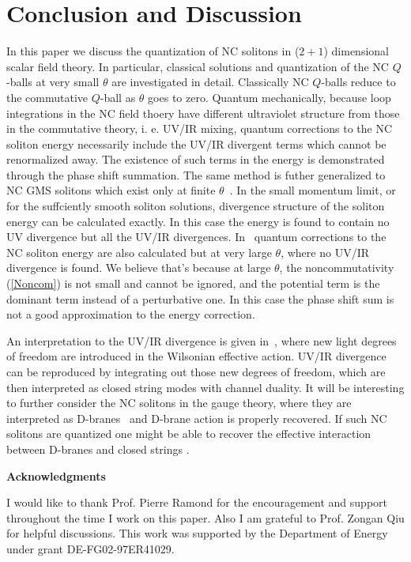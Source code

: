 \documentclass[a4paper,a4paper]{article}
\begin{document}
\section{Conclusion and Discussion}

In this paper we discuss the quantization of NC solitons in ($2+1$) dimensional 
scalar field theory. In particular, classical solutions and quantization of the 
NC $Q$-balls at very small $\theta$ are investigated in detail. Classically 
NC $Q$-balls reduce to the commutative $Q$-ball as $\theta$ goes to zero. 
Quantum mechanically, because loop integrations in the NC field thoery have different 
ultraviolet structure from those in the commutative theory, i. e. UV/IR mixing, 
quantum corrections to the NC soliton energy necessarily include the UV/IR 
divergent terms which cannot be renormalized away. The existence of such terms 
in the energy is demonstrated through the phase shift summation. The same method 
is futher generalized to NC GMS solitons which exist only at finite $\theta$\ . 
In the small momentum limit, or for the suffciently smooth soliton solutions, 
divergence structure of the soliton energy can be calculated exactly. In this case the 
energy is found to contain no UV divergence but all the UV/IR divergences. 
In~\cite{Miao} quantum corrections to the NC soliton energy are also calculated but 
at very large $\theta$, where no UV/IR divergence is found. We believe that's 
because at large $\theta$, the noncommutativity (\ref{Noncom}) is not small and 
cannot be ignored, and the potential term is the dominant term instead of a perturbative 
one. In this case the phase shift sum is not a good approximation to the energy 
correction. 

An interpretation to the UV/IR divergence is given in~\cite{RS2}, 
where new light degrees of freedom are introduced in the Wilsonian effective action. 
UV/IR divergence can be reproduced by integrating out those new degrees of freedom, 
which are then interpreted as closed string modes with channel duality.  
It will be interesting to further consider the NC solitons in the gauge theory, 
where they are interpreted as D-branes~\cite{MinUnstable,HarveyDbrane} and 
D-brane action is properly 
recovered. If such NC solitons are quantized one might be able to recover the effective 
interaction between D-branes and closed strings . 

 
\vskip 3cm
\centerline{\bf Acknowledgments} 
\vskip 0.3cm
I would like to thank Prof. 
Pierre Ramond for the encouragement and support throughout the time I work on this  
paper. Also I am grateful to Prof. Zongan Qiu for helpful discussions. This 
work was supported by the Department of Energy under grant
DE-FG02-97ER41029.
\end{document}
